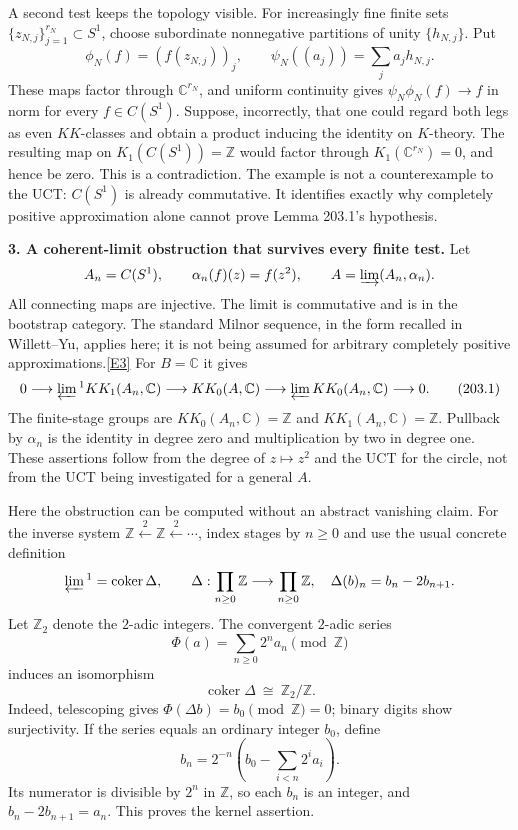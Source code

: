 \documentclass[11pt,a4paper]{article}
\newcommand{\Z}{\mathbb{Z}}
\newcommand{\C}{\mathbb{C}}
\newcommand{\eref}[2]{\hyperlink{extra:#1:#2}{[E#2]}}
\begin{document}
A second test keeps the topology visible. For increasingly fine finite
sets $\{z_{N,j}\}_{j=1}^{r_N}\subset S^1$, choose subordinate nonnegative
partitions of unity $\{h_{N,j}\}$. Put
\[
 \phi_N(f)=(f(z_{N,j}))_j,\qquad
 \psi_N((a_j))=\sum_j a_jh_{N,j}.
\]
These maps factor through $\C^{r_N}$, and uniform continuity gives
$\psi_N\phi_N(f)\to f$ in norm for every $f\in C(S^1)$.
Suppose, incorrectly, that one could regard both legs as even
$KK$-classes and obtain a product inducing the identity on $K$-theory.
The resulting map on $K_1(C(S^1))=\Z$ would factor through
$K_1(\C^{r_N})=0$, and hence be zero. This is a contradiction.
The example is not a counterexample to the UCT: $C(S^1)$ is already
commutative. It identifies exactly why completely positive approximation
alone cannot prove Lemma 203.1's hypothesis.

\textbf{3. A coherent-limit obstruction that survives every finite test.}
Let
\[
 A_n=C(S^1),\qquad \alpha_n(f)(z)=f(z^2),\qquad
 A=\varinjlim(A_n,\alpha_n).
\]
All connecting maps are injective. The limit is commutative and is in the
bootstrap category. The standard Milnor sequence, in the form recalled
in Willett--Yu, applies here; it is not being assumed for arbitrary
completely positive approximations.\eref{30006980}{3}
For $B=\C$ it gives
\[
 0\longrightarrow\varprojlim{}^{1} KK_1(A_n,\C)
 \longrightarrow KK_0(A,\C)
 \longrightarrow\varprojlim KK_0(A_n,\C)\longrightarrow0.
 \tag{203.1}
\]
The finite-stage groups are $KK_0(A_n,\C)=\Z$ and
$KK_1(A_n,\C)=\Z$. Pullback by $\alpha_n$ is the identity in degree zero
and multiplication by two in degree one. These assertions follow from
the degree of $z\mapsto z^2$ and the UCT for the circle, not from the UCT
being investigated for a general $A$.

Here the obstruction can be computed without an abstract vanishing
claim. For the inverse system $\Z\xleftarrow{2}\Z\xleftarrow{2}\cdots$,
index stages by $n\ge0$ and use the usual concrete definition
\[
 \varprojlim{}^{1}=\operatorname{coker}\Delta,\qquad
 \Delta:\prod_{n\ge0}\Z\longrightarrow\prod_{n\ge0}\Z,
 \quad\Delta(b)_n=b_n-2b_{n+1}.
\]
Let $\Z_2$ denote the $2$-adic integers. The convergent $2$-adic series
\[
 \Phi(a)=\sum_{n\ge0}2^n a_n\pmod{\Z}
\]
induces an isomorphism
\[
 \operatorname{coker}\Delta\ \cong\ \Z_2/\Z. \tag{203.2}
\]
Indeed, telescoping gives $\Phi(\Delta b)=b_0\pmod\Z=0$; binary digits
show surjectivity. If the series equals an ordinary integer $b_0$, define
\[
 b_n=2^{-n}\left(b_0-\sum_{i<n}2^ia_i\right).
\]
Its numerator is divisible by $2^n$ in $\Z$, so each $b_n$ is an integer,
and $b_n-2b_{n+1}=a_n$. This proves the kernel assertion.
\end{document}

